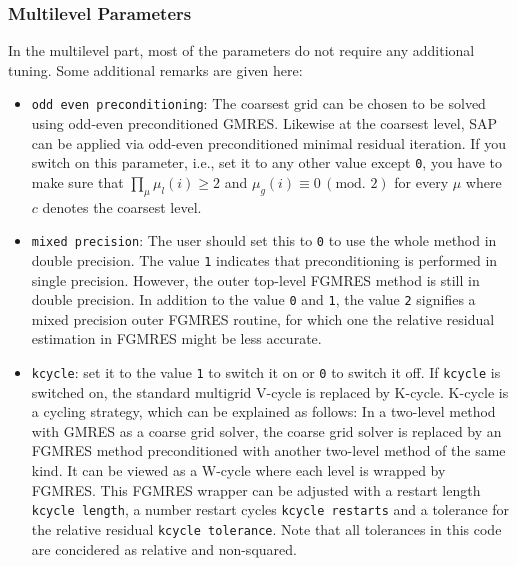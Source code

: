 \documentclass[a4paper,12pt]{scrartcl}
\begin{document}
\subsubsection{Multilevel Parameters}
In the multilevel part, most of the parameters do not require any additional tuning. Some additional remarks are given here:
\begin{itemize}
  \item \texttt{odd even preconditioning}:  The coarsest grid can be chosen to be solved using odd-even preconditioned GMRES.  Likewise at the coarsest level, SAP can be applied via odd-even preconditioned minimal residual iteration. If you switch on this parameter, i.e., set it to any other value except \texttt{0}, you have to make sure that $\prod_\mu \mu_l(i) \geq 2$ and $\mu_g(i) \equiv 0\, (\text{mod. }2)$ for every $\mu$ where $c$ denotes the coarsest level.
  \item \texttt{mixed precision}:   The user should set this to \texttt{0} to use the whole method in double precision. The value \texttt{1} indicates that preconditioning is performed in single precision.  However, the outer top-level FGMRES method is still in double precision.  In addition to the value \texttt{0} and \texttt{1}, the value \texttt{2} signifies a mixed precision outer FGMRES routine, for which one the relative residual estimation in FGMRES might be less accurate.
  \item \texttt{kcycle}: set it to the value \texttt{1} to switch it on or \texttt{0} to switch it off. If \texttt{kcycle} is switched on, the standard multigrid V-cycle is replaced by K-cycle.  K-cycle is a cycling strategy, which can be explained as follows: In a two-level method with GMRES as a coarse grid solver, the coarse grid solver is replaced by an FGMRES method preconditioned with another two-level method of the same kind. It can be viewed as a W-cycle where each level is wrapped by FGMRES. This FGMRES wrapper can be adjusted with a restart length \texttt{kcycle length}, a number restart cycles \texttt{kcycle restarts} and a tolerance for the relative residual \texttt{kcycle tolerance}. Note that all tolerances in this code are concidered as relative and non-squared.
\end{itemize}
\end{document}
